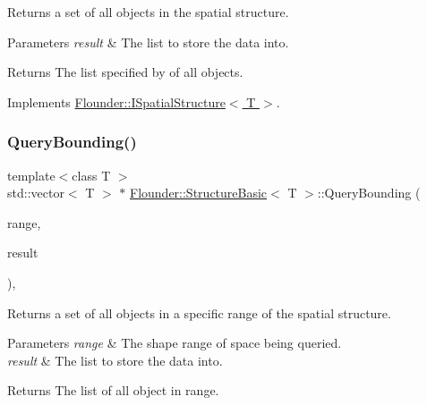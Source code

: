Returns a set of all objects in the spatial structure. 


\begin{DoxyParams}{Parameters}
{\em result} & The list to store the data into. \\
\hline
\end{DoxyParams}
\begin{DoxyReturn}{Returns}
The list specified by of all objects. 
\end{DoxyReturn}


Implements \hyperlink{class_flounder_1_1_i_spatial_structure_a973595818e65dfaf31fb8eaf79d5b6fd}{Flounder\+::\+I\+Spatial\+Structure$<$ T $>$}.

\mbox{\label{class_flounder_1_1_structure_basic_aa0f666b4212caeafcee431376a7f25cd}} 
\subsubsection{\texorpdfstring{Query\+Bounding()}{QueryBounding()}}
{\footnotesize\ttfamily template$<$class T $>$ \\
std\+::vector$<$ T $>$ $\ast$ \hyperlink{class_flounder_1_1_structure_basic}{Flounder\+::\+Structure\+Basic}$<$ T $>$\+::Query\+Bounding (\begin{DoxyParamCaption}\item[{\hyperlink{class_flounder_1_1_i_collider}{I\+Collider} $\ast$}]{range,  }\item[{std\+::vector$<$ T $>$ $\ast$}]{result }\end{DoxyParamCaption})\hspace{0.3cm}{\ttfamily [override]}, {\ttfamily [virtual]}}



Returns a set of all objects in a specific range of the spatial structure. 


\begin{DoxyParams}{Parameters}
{\em range} & The shape range of space being queried. \\
\hline
{\em result} & The list to store the data into. \\
\hline
\end{DoxyParams}
\begin{DoxyReturn}{Returns}
The list of all object in range. 
\end{DoxyReturn}



